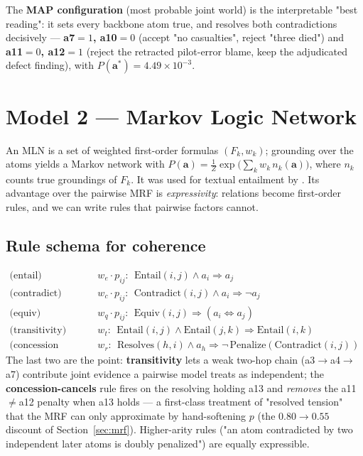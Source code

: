 \documentclass[11pt]{article}
\begin{document}
\noindent The \textbf{MAP configuration} (most probable joint world) is the interpretable
"best reading": it sets every backbone atom true, and resolves both contradictions
decisively --- \textbf{a7$=1$, a10$=0$} (accept "no casualties", reject "three died") and
\textbf{a11$=0$, a12$=1$} (reject the retracted pilot-error blame, keep the adjudicated
defect finding), with $P(\mathbf a^*)=4.49\times10^{-3}$.

\section{Model 2 --- Markov Logic Network}
\label{sec:mln}

An MLN \citep{mln,mln-cacm} is a set of weighted first-order formulas $(F_k,w_k)$; grounding
over the atoms yields a Markov network with
$P(\mathbf a)=\tfrac1Z\exp\!\big(\sum_k w_k\,n_k(\mathbf a)\big)$, where $n_k$ counts true
groundings of $F_k$. It was used for textual entailment by \citet{beltagy}. Its advantage
over the pairwise MRF is \emph{expressivity}: relations become first-order rules, and we can
write rules that pairwise factors cannot.

\subsection{Rule schema for coherence}
\begin{align*}
\text{(entail)}\quad & w_e\!\cdot\!p_{ij}:\ \ \mathrm{Entail}(i,j)\wedge a_i \Rightarrow a_j\\
\text{(contradict)}\quad & w_c\!\cdot\!p_{ij}:\ \ \mathrm{Contradict}(i,j)\wedge a_i \Rightarrow \neg a_j\\
\text{(equiv)}\quad & w_q\!\cdot\!p_{ij}:\ \ \mathrm{Equiv}(i,j)\Rightarrow (a_i \Leftrightarrow a_j)\\
\text{(transitivity)}\quad & w_t:\ \ \mathrm{Entail}(i,j)\wedge \mathrm{Entail}(j,k)\Rightarrow \mathrm{Entail}(i,k)\\
\text{(concession cancels)}\quad & w_r:\ \ \mathrm{Resolves}(h,i)\wedge a_h \Rightarrow \neg\,\mathrm{Penalize}(\mathrm{Contradict}(i,j))
\end{align*}
The last two are the point: \textbf{transitivity} lets a weak two-hop chain
(a3$\to$a4$\to$a7) contribute joint evidence a pairwise model treats as independent; the
\textbf{concession-cancels} rule fires on the resolving holding a13 and \emph{removes} the
a11$\neq$a12 penalty when a13 holds --- a first-class treatment of "resolved tension" that
the MRF can only approximate by hand-softening $p$ (the $0.80\!\to\!0.55$ discount of
Section~\ref{sec:mrf}). Higher-arity rules ("an atom contradicted by two independent later
atoms is doubly penalized") are equally expressible.
\end{document}
